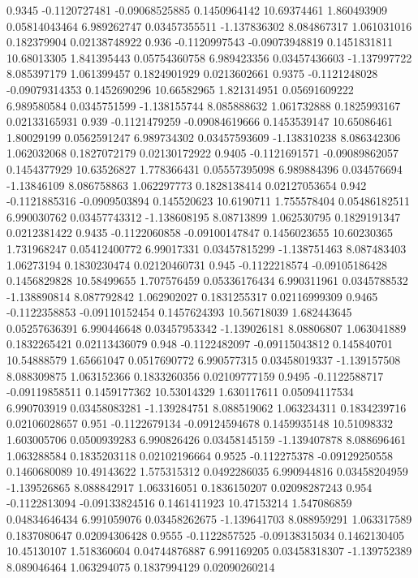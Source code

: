 {0.9345 -0.1120727481 -0.09068525885 0.1450964142 10.69374461 1.860493909 0.05814043464 6.989262747 0.03457355511 -1.137836302 8.084867317 1.061031016 0.182379904 0.02138748922
0.936 -0.1120997543 -0.09073948819 0.1451831811 10.68013305 1.841395443 0.05754360758 6.989423356 0.03457436603 -1.137997722 8.085397179 1.061399457 0.1824901929 0.0213602661
0.9375 -0.1121248028 -0.09079314353 0.1452690296 10.66582965 1.821314951 0.05691609222 6.989580584 0.0345751599 -1.138155744 8.085888632 1.061732888 0.1825993167 0.02133165931
0.939 -0.1121479259 -0.09084619666 0.1453539147 10.65086461 1.80029199 0.0562591247 6.989734302 0.03457593609 -1.138310238 8.086342306 1.062032068 0.1827072179 0.02130172922
0.9405 -0.1121691571 -0.09089862057 0.1454377929 10.63526827 1.778366431 0.05557395098 6.989884396 0.034576694 -1.13846109 8.086758863 1.062297773 0.1828138414 0.02127053654
0.942 -0.1121885316 -0.0909503894 0.145520623 10.6190711 1.755578404 0.05486182511 6.990030762 0.03457743312 -1.138608195 8.08713899 1.062530795 0.1829191347 0.0212381422
0.9435 -0.1122060858 -0.09100147847 0.1456023655 10.60230365 1.731968247 0.05412400772 6.99017331 0.03457815299 -1.138751463 8.087483403 1.06273194 0.1830230474 0.02120460731
0.945 -0.1122218574 -0.09105186428 0.1456829828 10.58499655 1.707576459 0.05336176434 6.990311961 0.0345788532 -1.138890814 8.087792842 1.062902027 0.1831255317 0.02116999309
0.9465 -0.1122358853 -0.09110152454 0.1457624393 10.56718039 1.682443645 0.05257636391 6.990446648 0.03457953342 -1.139026181 8.08806807 1.063041889 0.1832265421 0.02113436079
0.948 -0.1122482097 -0.09115043812 0.145840701 10.54888579 1.65661047 0.0517690772 6.990577315 0.03458019337 -1.139157508 8.088309875 1.063152366 0.1833260356 0.02109777159
0.9495 -0.1122588717 -0.09119858511 0.1459177362 10.53014329 1.630117611 0.05094117534 6.990703919 0.03458083281 -1.139284751 8.088519062 1.063234311 0.1834239716 0.02106028657
0.951 -0.1122679134 -0.09124594678 0.1459935148 10.51098332 1.603005706 0.0500939283 6.990826426 0.03458145159 -1.139407878 8.088696461 1.063288584 0.1835203118 0.02102196664
0.9525 -0.112275378 -0.09129250558 0.1460680089 10.49143622 1.575315312 0.0492286035 6.990944816 0.03458204959 -1.139526865 8.088842917 1.063316051 0.1836150207 0.02098287243
0.954 -0.1122813094 -0.09133824516 0.1461411923 10.47153214 1.547086859 0.04834646434 6.991059076 0.03458262675 -1.139641703 8.088959291 1.063317589 0.1837080647 0.02094306428
0.9555 -0.1122857525 -0.09138315034 0.1462130405 10.45130107 1.518360604 0.04744876887 6.991169205 0.03458318307 -1.139752389 8.089046464 1.063294075 0.1837994129 0.02090260214
}
